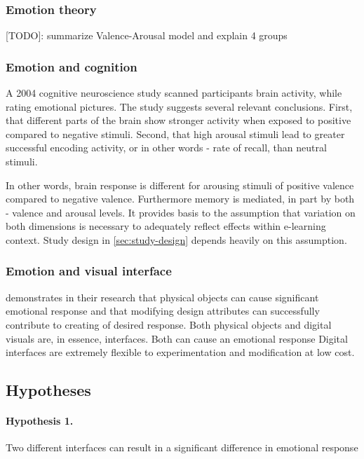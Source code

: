 		\subsubsection{Emotion theory}
		
		[TODO]: summarize Valence-Arousal model and explain 4 groups
		
		\subsubsection{Emotion and cognition} \label{sec:emotion-cognition}
		
		A 2004 cognitive neuroscience study \cite{Dolcos2004} scanned participants brain activity, while rating emotional pictures. The study suggests several relevant conclusions. First, that different parts of the brain show stronger activity when exposed to positive compared to negative stimuli. Second, that high arousal stimuli lead to greater successful encoding activity, or in other words - rate of recall, than neutral stimuli. 
		
		In other words, brain response is different for arousing stimuli of positive valence compared to negative valence. Furthermore memory is mediated, in part by both - valence and arousal levels. It provides basis to the assumption that variation on both dimensions is necessary to adequately reflect effects within e-learning context. Study design in \ref{sec:study-design} depends heavily on this assumption.
		
		\subsubsection{Emotion and visual interface}
		
		\cite{Desmet2007} demonstrates in their research that physical objects can cause significant emotional response and that modifying design attributes can successfully contribute to creating of desired response.
		Both physical objects and digital visuals are, in essence, interfaces. Both can cause an emotional response \citationneeded Digital interfaces are extremely flexible to experimentation and modification at low cost.
	
	\subsection{Hypotheses}
	
		\paragraph{Hypothesis 1.} Two different interfaces can result in a significant difference in emotional response
